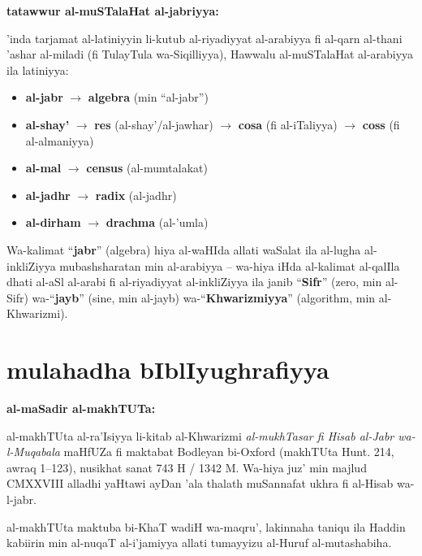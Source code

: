 \documentclass[11pt,a4paper]{book}
\begin{document}
\begin{commentary}
\textbf{tatawwur al-muSTalaHat al-jabriyya:}

'inda tarjamat al-latiniyyin li-kutub al-riyadiyyat al-arabiyya fi
al-qarn al-thani 'ashar al-miladi (fi TulayTula wa-Siqilliyya),
Hawwalu al-muSTalaHat al-arabiyya ila latiniyya:

\begin{itemize}
  \item \textbf{al-jabr} $\rightarrow$ \textbf{algebra} (min ``al-jabr'')
  \item \textbf{al-shay'} $\rightarrow$ \textbf{res} (al-shay'/al-jawhar)
    $\rightarrow$ \textbf{cosa} (fi al-iTaliyya)
    $\rightarrow$ \textbf{coss} (fi al-almaniyya)
  \item \textbf{al-mal} $\rightarrow$ \textbf{census} (al-mumtalakat)
  \item \textbf{al-jadhr} $\rightarrow$ \textbf{radix} (al-jadhr)
  \item \textbf{al-dirham} $\rightarrow$ \textbf{drachma} (al-'umla)
\end{itemize}

Wa-kalimat ``\textbf{jabr}'' (algebra) hiya al-waHIda allati waSalat
ila al-lugha al-inkliZiyya mubashsharatan min al-arabiyya -- wa-hiya
iHda al-kalimat al-qalIla dhati al-aSl al-arabi fi al-riyadiyyat
al-inkliZiyya ila janib ``\textbf{Sifr}'' (zero, min al-Sifr)
wa-``\textbf{jayb}'' (sine, min al-jayb) wa-``\textbf{Khwarizmiyya}''
(algorithm, min al-Khwarizmi).
\end{commentary}

\newpage

\chapter*{mulahadha bIblIyughrafiyya}

\begin{historicalbox}
\textbf{al-maSadir al-makhTUTa:}

al-makhTUta al-ra'Isiyya li-kitab al-Khwarizmi \textit{al-mukhTasar fi
Hisab al-Jabr wa-l-Muqabala} maHfUZa fi maktabat Bodleyan bi-Oxford
(makhTUta Hunt. 214, awraq 1--123), nusikhat sanat 743 H / 1342 M.
Wa-hiya juz' min majlud CMXXVIII alladhi yaHtawi ayDan 'ala thalath
muSannafat ukhra fi al-Hisab wa-l-jabr.

al-makhTUta maktuba bi-KhaT wadiH wa-maqru', lakinnaha taniqu ila
Haddin kabiirin min al-nuqaT al-i'jamiyya allati tumayyizu al-Huruf
al-mutashabiha.
\end{historicalbox}
\end{document}
